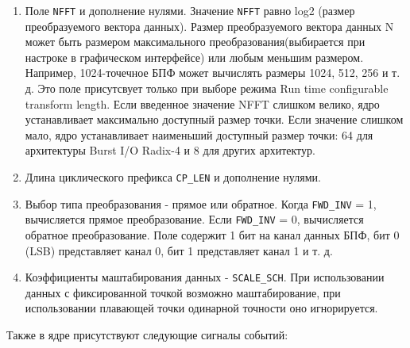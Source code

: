 \begin{enumerate}
	\item Поле \verb|NFFT| и дополнение нулями. Значение \verb|NFFT| равно log2 (размер преобразуемого вектора данных). Размер преобразуемого вектора данных N может быть размером максимального преобразования(выбирается при настроке в графическом интерфейсе) или любым меньшим размером. Например, 1024-точечное БПФ может вычислять размеры 1024, 512, 256 и т. д. Это поле присутсвует только при выборе режима Run time configurable transform length. Если введенное значение NFFT слишком велико, ядро устанавливает максимально доступный размер точки. Если значение слишком мало, ядро устанавливает наименьший доступный размер точки: 64 для архитектуры Burst I/O Radix-4 и 8 для других архитектур. 
	\item Длина циклического префикса \verb|CP_LEN| и дополнение нулями.
	\item Выбор типа преобразования - прямое или обратное. Когда \verb|FWD_INV| = 1, вычисляется прямое преобразование. Если \verb|FWD_INV| = 0, вычисляется обратное преобразование. Поле содержит 1 бит на канал данных БПФ, бит 0 (LSB) представляет канал 0, бит 1 представляет канал 1 и т. д.
	\item Коэффициенты маштабирования данных - \verb|SCALE_SCH|. При использовании данных с фиксированной точкой возможно маштабирование, при использовании плавающей точки одинарной точности оно игнорируется.
\end{enumerate}

Также в ядре присутствуют следующие сигналы событий:

